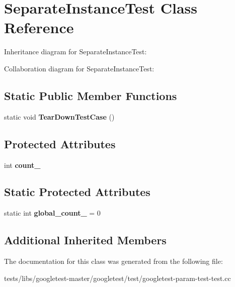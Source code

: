 \hypertarget{classSeparateInstanceTest}{}\section{Separate\+Instance\+Test Class Reference}
\label{classSeparateInstanceTest}


Inheritance diagram for Separate\+Instance\+Test\+:


Collaboration diagram for Separate\+Instance\+Test\+:
\subsection*{Static Public Member Functions}
\begin{DoxyCompactItemize}
\item 
\mbox{\label{classSeparateInstanceTest_a7c4a72843a7c4a9be56adef27ecd33c7}} 
static void {\bfseries Tear\+Down\+Test\+Case} ()
\end{DoxyCompactItemize}
\subsection*{Protected Attributes}
\begin{DoxyCompactItemize}
\item 
\mbox{\label{classSeparateInstanceTest_a04af1b3b711671ecb0778af1330a740f}} 
int {\bfseries count\+\_\+}
\end{DoxyCompactItemize}
\subsection*{Static Protected Attributes}
\begin{DoxyCompactItemize}
\item 
\mbox{\label{classSeparateInstanceTest_a79db6d4cdd6c99b256439cc020f782ef}} 
static int {\bfseries global\+\_\+count\+\_\+} = 0
\end{DoxyCompactItemize}
\subsection*{Additional Inherited Members}


The documentation for this class was generated from the following file\+:\begin{DoxyCompactItemize}
\item 
tests/libs/googletest-\/master/googletest/test/googletest-\/param-\/test-\/test.\+cc\end{DoxyCompactItemize}
